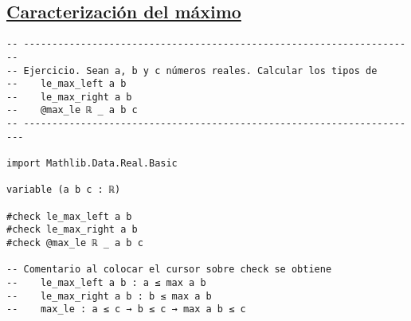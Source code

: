 \subsection{\href{./src/Basicos/Caracterizacion\_del\_maximo.lean}{Caracterización del máximo}}
\label{sec:org85144fc}
\begin{verbatim}
-- ---------------------------------------------------------------------
-- Ejercicio. Sean a, b y c números reales. Calcular los tipos de
--    le_max_left a b
--    le_max_right a b
--    @max_le ℝ _ a b c
-- ----------------------------------------------------------------------

import Mathlib.Data.Real.Basic

variable (a b c : ℝ)

#check le_max_left a b
#check le_max_right a b
#check @max_le ℝ _ a b c

-- Comentario al colocar el cursor sobre check se obtiene
--    le_max_left a b : a ≤ max a b
--    le_max_right a b : b ≤ max a b
--    max_le : a ≤ c → b ≤ c → max a b ≤ c
\end{verbatim}

